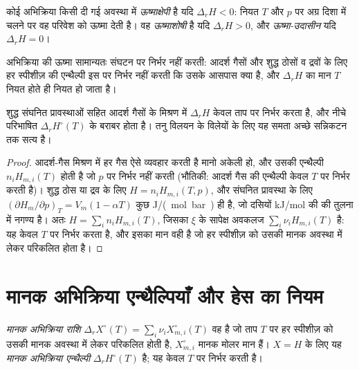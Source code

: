 \begin{definition}[ऊष्माक्षेपी, ऊष्माशोषी, ऊष्मा-उदासीन]\label{def:b2:reaction-enthalpy:exothermic}
कोई अभिक्रिया किसी दी गई अवस्था में \emph{ऊष्माक्षेपी} है यदि
$\Delta_r H < 0$: नियत $T$ और $p$ पर अग्र दिशा में चलने पर वह परिवेश को
ऊष्मा देती है। वह \emph{ऊष्माशोषी} है यदि $\Delta_r H >
0$, और \emph{ऊष्मा-उदासीन} यदि $\Delta_r H = 0$।
\end{definition}

अभिक्रिया की ऊष्मा सामान्यतः संघटन पर निर्भर नहीं करती:
आदर्श गैसों और शुद्ध ठोसों व द्रवों के लिए हर स्पीशीज़ की
एन्थैल्पी इस पर निर्भर नहीं करती कि उसके आसपास क्या है, और $\Delta_r H$
का मान $T$ नियत होते ही नियत हो जाता है।

\begin{proposition}[आदर्श निकाय]\label{prop:b2:reaction-enthalpy:ideal}
शुद्ध संघनित प्रावस्थाओं सहित आदर्श गैसों के मिश्रण में $\Delta_r H$
केवल ताप पर निर्भर करता है, और नीचे परिभाषित  $\Delta_r H^\circ(T)$ के बराबर होता है। तनु विलयन के
विलेयों के लिए यह समता अच्छे सन्निकटन तक सत्य है।
\end{proposition}

\begin{proof}
आदर्श-गैस मिश्रण में हर गैस ऐसे व्यवहार करती है मानो अकेली हो, और उसकी
एन्थैल्पी $n_iH_{m,i}(T)$ होती है जो $p$ पर निर्भर नहीं करती (भौतिकी: आदर्श
गैस की एन्थैल्पी केवल $T$ पर निर्भर करती है)। शुद्ध ठोस या द्रव के लिए $H = n_iH_{m,i}(T,
p)$, और संघनित प्रावस्था के लिए $(\partial H_m/\partial p)_T = V_m(1 - \alpha T)$ कुछ
\unit{J/(mol.bar)} ही है, जो दसियों \unit{kJ/mol} की  की तुलना में नगण्य है। अतः $H = \sum_in_iH_{m,i}(T)$, जिसका
$\xi$ के सापेक्ष अवकलज $\sum_i\nu_iH_{m,i}(T)$ है: यह केवल
$T$ पर निर्भर करता है, और इसका मान वही है जो हर स्पीशीज़ को उसकी
मानक अवस्था में लेकर परिकलित होता है।
\end{proof}

\section{मानक अभिक्रिया एन्थैल्पियाँ और हेस का नियम}

\begin{definition}[मानक अभिक्रिया राशि]\label{def:b2:reaction-enthalpy:standard-reaction-enthalpy}
\emph{मानक अभिक्रिया राशि}
$\Delta_r X^\circ(T) = \sum_i\nu_iX_{m,i}^\circ(T)$ वह  है
जो ताप $T$ पर हर स्पीशीज़ को उसकी मानक अवस्था में लेकर परिकलित होती है,
$X_{m,i}^\circ$ मानक मोलर मान हैं। $X = H$ के लिए यह
\emph{मानक अभिक्रिया एन्थैल्पी}
$\Delta_r H^\circ(T)$ है; यह केवल $T$ पर निर्भर करती है।
\end{definition}

